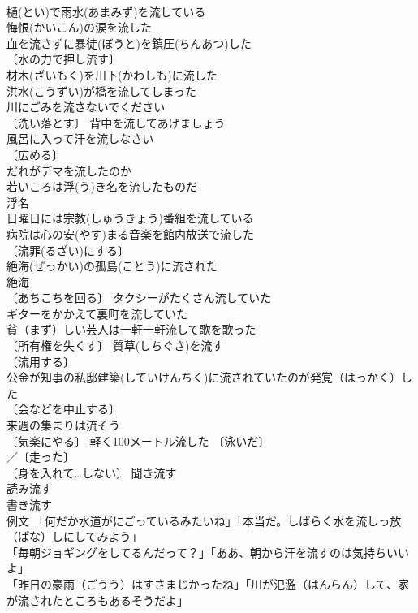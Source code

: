 \documentclass[8pt]{extreport}
\begin{document}
\begin{CJK}{UTF8}{min}
\\	樋(とい)で雨水(あまみず)を流している 
\\	悔恨(かいこん)の涙を流した 
\\	血を流さずに暴徒(ぼうと)を鎮圧(ちんあつ)した 
\\	〔水の力で押し流す〕　
\\	材木(ざいもく)を川下(かわしも)に流した 
\\	洪水(こうずい)が橋を流してしまった 
\\	川にごみを流さないでください 
\\	〔洗い落とす〕 背中を流してあげましょう 
\\	風呂に入って汗を流しなさい 
\\	〔広める〕
\\	だれがデマを流したのか 
\\	若いころは浮(う)き名を流したものだ 
\\	浮名 
\\	日曜日には宗教(しゅうきょう)番組を流している 
\\	病院は心の安(やす)まる音楽を館内放送で流した 
\\	〔流罪(るざい)にする〕　
\\	絶海(ぜっかい)の孤島(ことう)に流された 
\\	絶海　
\\	〔あちこちを回る〕 タクシーがたくさん流していた 
\\	ギターをかかえて裏町を流していた 
\\	貧（まず）しい芸人は一軒一軒流して歌を歌った 
\\	〔所有権を失くす〕 質草(しちぐさ)を流す 
\\	〔流用する〕 
\\	公金が知事の私邸建築(していけんちく)に流されていたのが発覚（はっかく）した 
\\	〔会などを中止する〕 
\\	来週の集まりは流そう 
\\	〔気楽にやる〕 軽く100メートル流した 〔泳いだ〕
\\	／〔走った〕
\\	〔身を入れて…しない〕 聞き流す 
\\	読み流す 
\\	書き流す 
\\	例文 「何だか水道がにごっているみたいね」「本当だ。しばらく水を流しっ放（ぱな）しにしてみよう」 
\\	「毎朝ジョギングをしてるんだって？」「ああ、朝から汗を流すのは気持ちいいよ」 
\\	「昨日の豪雨（ごうう）はすさまじかったね」「川が氾濫（はんらん）して、家が流されたところもあるそうだよ」 

\end{CJK}
\end{document}
